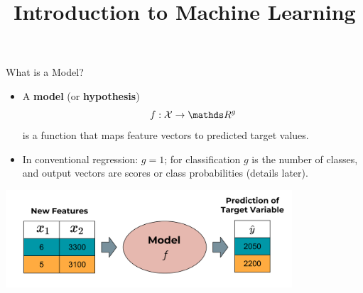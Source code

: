 \documentclass[11pt,compress,t,notes=noshow, xcolor=table]{beamer}
\title{Introduction to Machine Learning}
\institute{\href{https://compstat-lmu.github.io/lecture_i2ml/}{compstat-lmu.github.io/lecture\_i2ml}}
\date{}
\begin{document}










\begin{vbframe}{What is a Model?}

\begin{itemize}

  \item A \textbf{model} (or \textbf{hypothesis}) 
  $$f : \Xspace \rightarrow \R^g$$ 
  is a function that maps feature vectors to predicted target values.

\item In conventional regression: $g = 1$; for 
classification $g$ is the number of classes, and output vectors are scores 
or class probabilities (details later).
  
  
\end{itemize}

\begin{center}
  \includegraphics[width = 0.8\textwidth]{figure_man/the_model_web} 
\end{center}
  


\end{vbframe}
\end{document}
